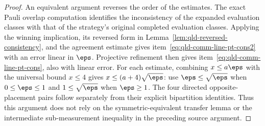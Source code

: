 \begin{proof}
	An equivalent argument reverses the order of the estimates. The exact
	Pauli overlap computation identifies the inconsistency of the expanded
	evaluation classes with that of the strategy's original completed
	evaluation classes. Applying the winning implication, its reversed form
	in Lemma~\ref{lem:qld-reversed-consistency}, and the
	agreement estimate gives item~\ref{eq:qld-comm-line-pt-cons2} with
	an error linear in $\eps$. Projective refinement then gives
	item~\ref{eq:qld-comm-line-pt-cons}, also with linear error.
	For each estimate, combining $x\leq a\eps$ with the universal bound
	$x\leq 4$ gives $x\leq(a+4)\sqrt{\eps}$: use
	$\eps\leq\sqrt{\eps}$ when $0\leq\eps\leq 1$ and
	$1\leq\sqrt{\eps}$ when $\eps\geq 1$.
	The four directed opposite-placement pairs follow separately from
	their explicit bipartition identities. Thus this argument does not
	rely on the symmetric-equivalent transfer lemma or the intermediate
	sub-measurement inequality in the preceding source argument.
\end{proof}

